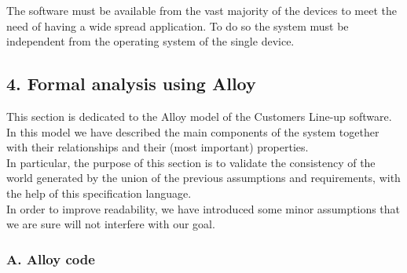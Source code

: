 The software must be available from the vast majority of the devices to
meet the need of having a wide spread application. To do so the system
must be independent from the operating system of the single device.

\hypertarget{formal-analysis-using-alloy}{%
\subsection{4. Formal analysis using
Alloy}\label{formal-analysis-using-alloy}}

This section is dedicated to the Alloy model of the Customers Line-up
software. In this model we have described the main components of the
system together with their relationships and their (most important)
properties.\\
In particular, the purpose of this section is to validate the
consistency of the world generated by the union of the previous
assumptions and requirements, with the help of this specification
language.\\
In order to improve readability, we have introduced some minor
assumptions that we are sure will not interfere with our goal.

\hypertarget{a.-alloy-code}{%
\subsubsection{A. Alloy code}\label{a.-alloy-code}}


